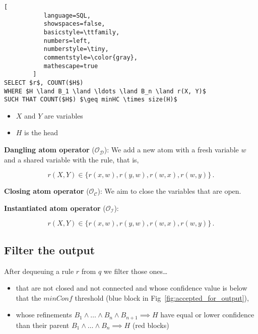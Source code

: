\documentclass{article}
\begin{document}

\begin{lstlisting}[
           language=SQL,
           showspaces=false,
           basicstyle=\ttfamily,
           numbers=left,
           numberstyle=\tiny,
           commentstyle=\color{gray},
           mathescape=true
        ]
SELECT $r$, COUNT($H$)
WHERE $H \land B_1 \land \ldots \land B_n \land r(X, Y)$
SUCH THAT COUNT($H$) $\geq minHC \times size(H)$
\end{lstlisting}

\begin{itemize}
    \item $X$ and $Y$ are variables
    \item $H$ is the head
\end{itemize}

\noindent \textbf{Dangling atom operator} ($\mathcal{O}_\mathcal{D}$): We add a new atom with a
fresh variable $w$ and a shared variable with the rule, that is,

\begin{equation}
    r(X, Y) \in \{ r(x, w), r(y, w), r(w, x), r(w, y) \}\,.
\end{equation}

\noindent \textbf{Closing atom operator} ($\mathcal{O}_\mathcal{C}$): We aim to close the variables
that are open.

\noindent \textbf{Instantiated atom operator} ($\mathcal{O}_\mathcal{I}$):

\begin{equation}
    r(X, Y) \in \{ r(x, w), r(y, w), r(w, x), r(w, y) \}\,.
\end{equation}

\subsection{Filter the output}
\label{ssec:filter_output}

After dequeuing a rule $r$ from $q$ we filter those ones\ldots

\begin{itemize}
    \item that are not closed and not connected and whose confidence value is
        below that the $minConf$ threshold (blue block in Fig~\ref{fig:accepted_for_output}),
    \item whose refinements $B_1 \land \ldots \land B_n \land B_{n+1} \implies H$
        have equal or lower confidence than their parent
        $B_1 \land \ldots \land B_n \implies H$ (red blocks)
\end{itemize}
\end{document}
